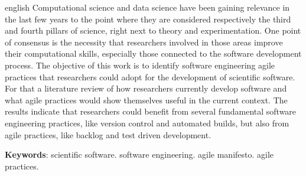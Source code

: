 \documentclass[
	article,			%
	11pt,				%
	oneside,			%
	a4paper,			%
	english,			%
	brazil,				%
	sumario=tradicional
	]{abntex2}
\begin{document}
\postextual



\emptythanks
\maketitle

\renewcommand{\resumoname}{Abstract}
\begin{resumoumacoluna}
 \begin{otherlanguage*}{english}
   Computational science and data science have been gaining relevance in the last few years to the point where they are considered respectively the third and fourth pillars of science, right next to theory and experimentation. One point of consensus is the necessity that researchers involved in those areas improve their computational skills, especially those connected to the software development process. The objective of this work is to identify software engineering agile practices that researchers could adopt for the development of scientific software. For that a literature review of how researchers currently develop software and what agile practices would show themselves useful in the current context. The results indicate that researchers could benefit from several fundamental software engineering practices, like version control and automated builds, but also from agile practices, like backlog and test driven development.

   \vspace{\onelineskip}
 
   \noindent
   \textbf{Keywords}: scientific software. software engineering. agile manifesto. agile practices.
 \end{otherlanguage*}  
\end{resumoumacoluna}

\nocite{beck2004}
\nocite{sutherland2013}
\nocite{beck2001}
\nocite{alliance2015}

\end{document}
